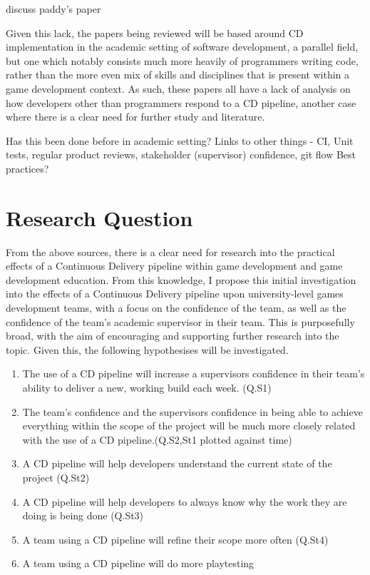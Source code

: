 \documentclass[lettersize,journal]{IEEEtran}
\begin{document}
    discuss paddy's paper    

    Given this lack, the papers being reviewed will be based around CD implementation in the academic setting of software development, a parallel field, but one which notably consists much more heavily of programmers writing code, rather than the more even mix of skills and disciplines that is present within a game development context. As such, these papers all have a lack of analysis on how developers other than programmers respond to a CD pipeline, another case where there is a clear need for further study and literature.


    Has this been done before in academic setting\cite{CDCourse2014,CDMobileDev,IndustryAcademyDenmark}? 
    Links to other things - CI\cite{CICDCD}, Unit tests, regular product reviews, stakeholder (supervisor) confidence, git flow\cite{gitBranching}
    Best practices\cite{duvall2007continuous}? 

\section{Research Question}
    From the above sources, there is a clear need for research into the practical effects of a Continuous Delivery pipeline within game development and game development education. From this knowledge, I propose this initial investigation into the effects of a Continuous Delivery pipeline upon university-level games development teams, with a focus on the confidence of the team, as well as the confidence of the team's academic supervisor in their team. 
    This is purposefully broad, with the aim of encouraging and supporting further research into the topic. Given this, the following hypothesises will be investigated.

    \begin{enumerate}
        \item \label{h_supconfidence} The use of a CD pipeline will increase a supervisors confidence in their team's ability to deliver a new, working build each week. (Q.S1)
        \item \label{h_supteamconfidence} The team's confidence and the supervisors confidence in being able to achieve everything within the scope of the project will be much more closely related with the use of a CD pipeline.(Q.S2,St1 plotted against time)
        \item \label{h_projectstate} A CD pipeline will help developers understand the current state of the project (Q.St2)
        \item \label{h_workreason} A CD pipeline will help developers to always know why the work they are doing is being done (Q.St3)
        \item \label{h_scoperefine} A team using a CD pipeline will refine their scope more often (Q.St4)
        \item \label{h_playtesting} A team using a CD pipeline will do more playtesting
    \end{enumerate}
\end{document}
